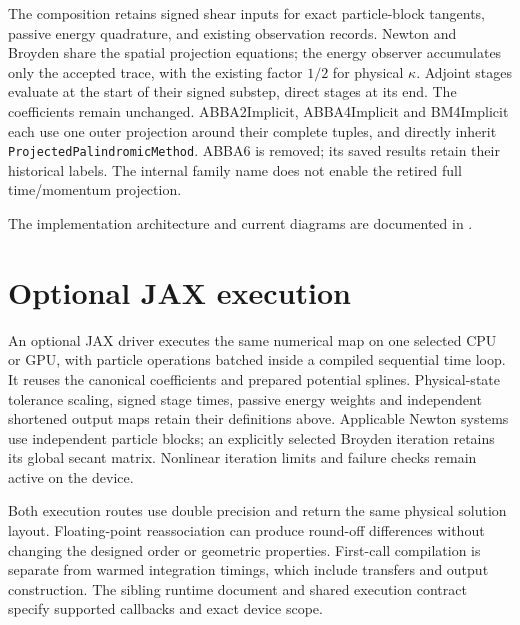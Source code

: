 \documentclass[11pt,a4paper]{article}
\begin{document}
The composition retains signed shear inputs for exact particle-block tangents,
passive energy quadrature, and existing observation records. Newton and Broyden
share the spatial projection equations; the energy observer accumulates only the
accepted trace, with the existing factor $1/2$ for physical $\kappa$.
Adjoint stages evaluate at the start of their signed substep, direct stages at
its end. The coefficients remain unchanged. ABBA2Implicit, ABBA4Implicit
and BM4Implicit each use one outer projection around their complete tuples,
and directly inherit \texttt{ProjectedPalindromicMethod}. ABBA6 is removed;
its saved results retain their historical labels. The internal family name
does not enable the retired full time/momentum projection.

The implementation architecture and current diagrams are documented in
.


\section{Optional JAX execution}

An optional JAX driver executes the same numerical map on one selected CPU
or GPU, with particle operations batched inside a compiled sequential time
loop. It reuses the canonical coefficients and prepared potential splines.
Physical-state tolerance scaling, signed stage times, passive energy weights
and independent shortened output maps retain their definitions above.
Applicable Newton systems use independent particle blocks; an explicitly
selected Broyden iteration retains its global secant matrix. Nonlinear
iteration limits and failure checks remain active on the device.

Both execution routes use double precision and return the same physical
solution layout. Floating-point reassociation can produce round-off
differences without changing the designed order or geometric properties.
First-call compilation is separate from warmed integration timings, which
include transfers and output construction. The sibling runtime document and
shared execution contract specify supported callbacks and exact device scope.
\end{document}
